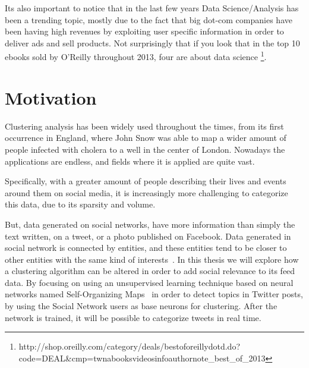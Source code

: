 Its also important to notice that in the last few years Data Science/Analysis has been a trending topic, mostly due to the fact that big dot-com companies have been having high revenues by exploiting user specific information in order to deliver ads and sell products. Not surprisingly that if you look that in the top 10 ebooks sold by O'Reilly throughout 2013, four are about data science \footnote{http://shop.oreilly.com/category/deals/best\-of\-oreilly\-dotd.do?code=DEAL\&cmp=tw\-na\-books\-videos\-info\-authornote\_best\_of\_2013}.
 

\section{Motivation}
Clustering analysis has been widely used throughout the times, from its first occurrence in England, where John Snow was able to map a wider amount of people infected with cholera to a well in the center of London. Nowadays the applications are endless, and fields where it is applied are quite vast.

Specifically, with a greater amount of people describing their lives and events around them on social media, it is increasingly more challenging to categorize this data, due to its sparsity and volume. 

But, data generated on social networks, have more information than simply the text written, on a tweet, or a photo published on Facebook. Data generated in social network is connected by entities, and these entities tend to be closer to other entities with the same kind of interests~\cite{McPherson2001}. In this thesis we will explore how a clustering algorithm can be altered in order to add social relevance to its feed data. By focusing  on using an unsupervised learning technique based on neural networks named Self-Organizing Maps~\cite{Kohonen1990} in order to detect topics in Twitter posts, by using the Social Network users as base neurons for clustering. After the network is trained, it will be possible to categorize tweets in real time. 

